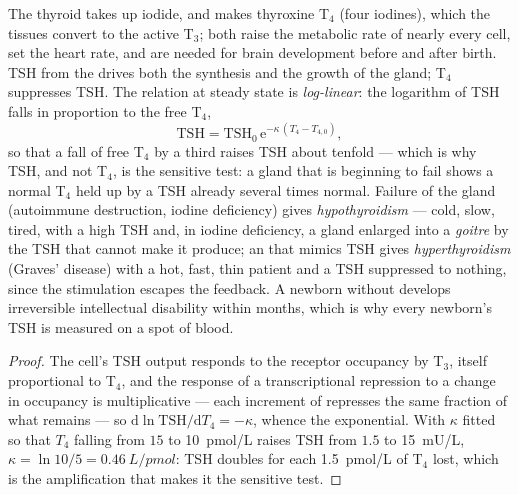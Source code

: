 \begin{proposition}\label{prop:b3:endocrinology:thyroid}
The thyroid takes up iodide, and makes thyroxine T$_{4}$ (four
iodines), which the tissues convert to the active T$_{3}$; both raise
the metabolic rate of nearly every cell, set the heart rate, and are
needed for brain development before and after birth. TSH from the
 drives both the synthesis and the growth of the gland; T$_{4}$
suppresses TSH. The relation at steady state is \emph{log-linear}: the
logarithm of TSH falls in proportion to the free T$_{4}$,
\[
\text{TSH} = \text{TSH}_{0}\,\mathrm{e}^{-\kappa\,(T_{4} - T_{4,0})},
\]
so that a fall of free T$_{4}$ by a third raises TSH about tenfold ---
which is why TSH, and not T$_{4}$, is the sensitive test: a gland that is
beginning to fail shows a normal T$_{4}$ held up by a TSH already several
times normal. Failure of the gland (autoimmune destruction, iodine
deficiency) gives \emph{hypothyroidism} --- cold, slow, tired, with a
high TSH and, in iodine deficiency, a gland enlarged into a
\emph{goitre} by the TSH that cannot make it produce; an  that
mimics TSH gives \emph{hyperthyroidism} (Graves' disease) with a hot,
fast, thin patient and a TSH suppressed to nothing, since the
stimulation escapes the feedback. A newborn without 
develops irreversible intellectual disability within months, which is
why every newborn's TSH is measured on a spot of blood.
\end{proposition}
\begin{proof}
The  cell's TSH output responds to the receptor occupancy by
T$_{3}$, itself proportional to T$_{4}$, and the response of a
transcriptional repression to a change in occupancy is multiplicative
--- each increment of  represses the same fraction of what
remains --- so $\mathrm{d}\ln\text{TSH}/\mathrm{d}T_{4} = -\kappa$,
whence the exponential. With $\kappa$ fitted so that $T_{4}$ falling
from $15$ to \qty{10}{pmol/L} raises TSH from $1.5$ to \qty{15}{mU/L},
$\kappa = \ln 10/5 = \qty{0.46}{L/pmol}$: TSH doubles for each
\qty{1.5}{pmol/L} of T$_{4}$ lost, which is the amplification that makes
it the sensitive test.
\end{proof}

